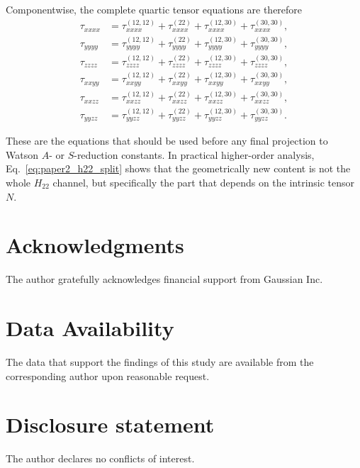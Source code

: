 \documentclass[aip,jcp,reprint]{revtex4-2}
\begin{document}
\begin{widetext}
Componentwise, the complete quartic tensor equations are therefore
\begin{align}
\tau_{xxxx} &= \tau^{(12,12)}_{xxxx} + \tau^{(22)}_{xxxx} + \tau^{(12,30)}_{xxxx} + \tau^{(30,30)}_{xxxx}, \\
\tau_{yyyy} &= \tau^{(12,12)}_{yyyy} + \tau^{(22)}_{yyyy} + \tau^{(12,30)}_{yyyy} + \tau^{(30,30)}_{yyyy}, \\
\tau_{zzzz} &= \tau^{(12,12)}_{zzzz} + \tau^{(22)}_{zzzz} + \tau^{(12,30)}_{zzzz} + \tau^{(30,30)}_{zzzz}, \\
\tau_{xxyy} &= \tau^{(12,12)}_{xxyy} + \tau^{(22)}_{xxyy} + \tau^{(12,30)}_{xxyy} + \tau^{(30,30)}_{xxyy}, \\
\tau_{xxzz} &= \tau^{(12,12)}_{xxzz} + \tau^{(22)}_{xxzz} + \tau^{(12,30)}_{xxzz} + \tau^{(30,30)}_{xxzz}, \\
\tau_{yyzz} &= \tau^{(12,12)}_{yyzz} + \tau^{(22)}_{yyzz} + \tau^{(12,30)}_{yyzz} + \tau^{(30,30)}_{yyzz}.
\end{align}

These are the equations that should be used before any final projection to
Watson $A$- or $S$-reduction constants.  In practical higher-order
analysis, Eq.~\eqref{eq:paper2_h22_split} shows that the geometrically new
content is not the whole $H_{22}$ channel, but specifically the part that
depends on the intrinsic tensor $N$.

\section*{Acknowledgments}
The author gratefully acknowledges financial support from Gaussian Inc.

\section*{Data Availability}
The data that support the findings of this study are available from the corresponding author upon reasonable request. 

\section*{Disclosure statement}
The author declares no conflicts of interest.

\end{widetext}


\end{document}
